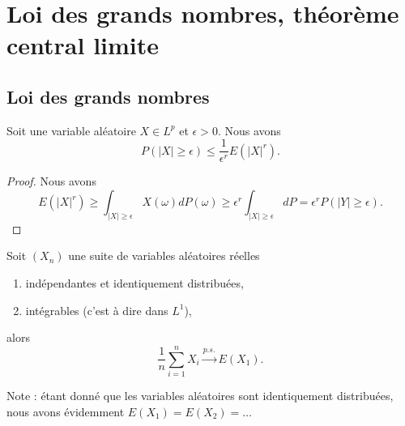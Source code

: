 \section{Loi des grands nombres, théorème central limite}

\subsection{Loi des grands nombres}

\begin{lemma}
    Soit une variable aléatoire \( X\in L^p\) et \( \epsilon>0\). Nous avons
    \begin{equation}
        P(| X |\geq \epsilon)\leq \frac{1}{ \epsilon^r }E(| X |^r).
    \end{equation}
\end{lemma}

\begin{proof}
    Nous avons
    \begin{equation}
        E(| X |^r)\geq\int_{| X |\geq \epsilon}X(\omega)dP(\omega)\geq \epsilon^r\int_{| X |\geq\epsilon}dP=\epsilon^rP(| Y |\geq\epsilon).
    \end{equation}
\end{proof}

\begin{theorem}     \label{ThoefQyKZ}
    Soit \( (X_n)\) une suite de variables aléatoires réelles
    \begin{enumerate}
        \item
            indépendantes et identiquement distribuées,
        \item
            intégrables (c'est à dire dans \( L^1\)),
    \end{enumerate}
    alors
    \begin{equation}
        \frac{1}{ n }\sum_{i=1}^nX_i  \stackrel{p.s.}{\longrightarrow} E(X_1).
    \end{equation}
\end{theorem}
Note : étant donné que les variables aléatoires sont identiquement distribuées, nous avons évidemment \( E(X_1)=E(X_2)=\ldots\)

